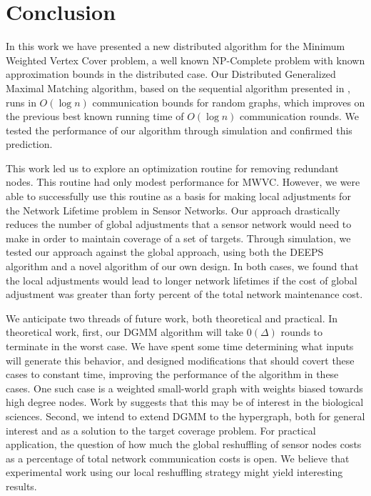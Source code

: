 \section{Conclusion}
\label{sec:conclusion}

In this work we have presented a new distributed algorithm for the Minimum Weighted Vertex Cover problem, a well known NP-Complete problem with known approximation bounds in the distributed case\cite{1011811}. Our Distributed Generalized Maximal Matching algorithm, based on the sequential algorithm presented in \cite{Gonzalez1995129}, runs in $O(\log n)$ communication bounds for random graphs, which improves on the previous best known running time of $O(\log n)$ communication rounds\cite{1582746}. We tested the performance of our algorithm through simulation and confirmed this prediction.

This work led us to explore an optimization routine for removing redundant nodes. This routine had only modest performance for MWVC. However, we were able to successfully use this routine as a basis for making local adjustments for the Network Lifetime problem in Sensor Networks. Our approach drastically reduces the number of global adjustments that a sensor network would need to make in order to maintain coverage of a set of targets. Through simulation, we tested our approach against the global approach, using both the DEEPS algorithm\cite{1640702} and a novel algorithm of our own design. In both cases, we found that the local adjustments would lead to longer network lifetimes if the cost of global adjustment was greater than forty percent of the total network maintenance cost.

We anticipate two threads of future work, both theoretical and practical. In theoretical work, first, our DGMM algorithm will take $0(\Delta)$ rounds to terminate in the worst case. We have spent some time determining what inputs will generate this behavior, and designed modifications that should covert these cases to constant time, improving the performance of the algorithm in these cases. One such case is a weighted small-world graph with weights biased towards high degree nodes. Work by \cite{PhysRevE.65.061910} suggests that this may be of interest in the biological sciences. Second, we intend to extend DGMM to the hypergraph, both for general interest and as a solution to the target coverage problem. For practical application, the question of how much the global reshuffling of sensor nodes costs as a percentage of total network communication costs is open. We believe that experimental work using our local reshuffling strategy might yield interesting results.
